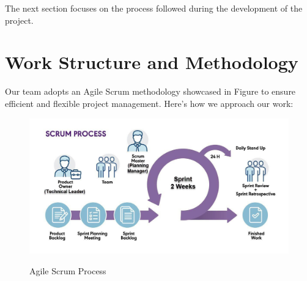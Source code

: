 The next section focuses on the process followed during the development of the project. 

\section{Work Structure and Methodology}

Our team adopts an Agile Scrum methodology showcased in Figure  to ensure 
efficient and flexible project management. Here’s how we approach our work:

\begin{figure}[H]
    \begin{center}
       \includegraphics[width=6in]{images/Chap0/blog-scrum-process-opt.jpg}\\
       \caption{Agile Scrum Process \cite{R6}}
       \label{Agile Scrum Process}
       \end{center}
\end{figure}

